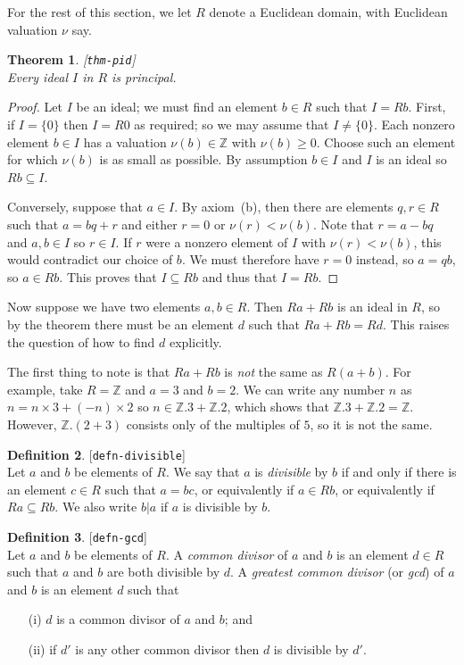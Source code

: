 \documentclass{amsart}
\newcommand{\lbl}[1]{\label{#1}\textup{[\texttt{#1}]}\ \\}
\newcommand{\lbl}{\label}
\newcommand{\Z}         {{\mathbb{Z}}}
\newcommand{\sse}       {\subseteq}
\newcommand{\tm}        {\times}
\renewcommand{\:}{\colon}
\newtheorem{theorem}{Theorem}[section]
\theoremstyle{definition}
\newtheorem{definition}[theorem]{Definition}
\begin{document}
For the rest of this section, we let $R$ denote a Euclidean domain,
with Euclidean valuation $\nu$ say.

\begin{theorem}\lbl{thm-pid}
 Every ideal $I$ in $R$ is principal.
\end{theorem}
\begin{proof}
 Let $I$ be an ideal; we must find an element $b\in R$ such that
 $I=Rb$.  First, if $I=\{0\}$ then $I=R0$ as required; so we may
 assume that $I\neq\{0\}$.  Each nonzero element $b\in I$ has a
 valuation $\nu(b)\in\Z$ with $\nu(b)\geq 0$.  Choose such an element
 for which $\nu(b)$ is as small as possible.  By assumption $b\in I$
 and $I$ is an ideal so $Rb\sse I$.  

 Conversely, suppose that $a\in I$.  By axiom~(b), then there are
 elements $q,r\in R$ such that $a=bq+r$ and either $r=0$ or
 $\nu(r)<\nu(b)$.  Note that $r=a-bq$ and $a,b\in I$ so $r\in I$.  If
 $r$ were a nonzero element of $I$ with $\nu(r)<\nu(b)$, this would
 contradict our choice of $b$.  We must therefore have $r=0$ instead,
 so $a=qb$, so $a\in Rb$.  This proves that $I\sse Rb$ and thus that
 $I=Rb$.
\end{proof}

Now suppose we have two elements $a,b\in R$.  Then $Ra+Rb$ is an ideal
in $R$, so by the theorem there must be an element $d$ such that
$Ra+Rb=Rd$.  This raises the question of how to find $d$ explicitly.

The first thing to note is that $Ra+Rb$ is \emph{not} the same as
$R(a+b)$.  For example, take $R=\Z$ and $a=3$ and $b=2$.  We can write
any number $n$ as $n=n\tm 3+(-n)\tm 2$ so $n\in\Z.3+\Z.2$, which shows
that $\Z.3+\Z.2=\Z$.  However, $\Z.(2+3)$ consists only of the
multiples of $5$, so it is not the same.  

\begin{definition}\lbl{defn-divisible}
 Let $a$ and $b$ be elements of $R$.  We say that $a$ is
 \emph{divisible} by $b$ if and only if there is an element $c\in R$
 such that $a=bc$, or equivalently if $a\in Rb$, or equivalently if
 $Ra\sse Rb$.  We also write $b|a$ if $a$ is divisible by $b$.
\end{definition}

\begin{definition}\lbl{defn-gcd}
 Let $a$ and $b$ be elements of $R$.  A \emph{common divisor} of $a$
 and $b$ is an element $d\in R$ such that $a$ and $b$ are both
 divisible by $d$.  A \emph{greatest common divisor} (or \emph{gcd})
 of $a$ and $b$ is an element $d$ such that
 \begin{itemize}
 \item[(i)] $d$ is a common divisor of $a$ and $b$; and
 \item[(ii)] if $d'$ is any other common divisor then $d$ is divisible
  by $d'$.
 \end{itemize}
\end{definition}
\end{document}
